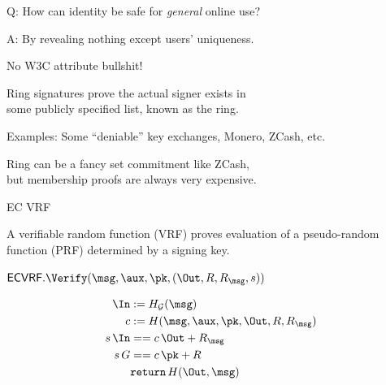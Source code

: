 \documentclass{beamer}
\begin{document}
\begin{frame} %
	
Q: How can identity be safe for {\it general} online use?

\bigskip

A: By revealing nothing except users' uniqueness.  %

\bigskip\bigskip

\hspace{10pt} No W3C attribute bullshit!

\end{frame}



\begin{frame}
	
Ring signatures prove the actual signer exists in \\
\hspace{10pt} some publicly specified list, known as the ring.

\bigskip\bigskip

Examples:  Some ``deniable'' key exchanges, Monero, ZCash, etc.

\bigskip\bigskip

Ring can be a fancy set commitment like ZCash, \\
\hspace{10pt} but membership proofs are always very expensive.
	
\end{frame}



\begin{frame}{EC VRF}

A verifiable random function (VRF) proves evaluation of a pseudo-random function (PRF) determined by a signing key.

\bigskip\bigskip

$\mathsf{ECVRF}.\Verify(\msg,\aux,\pk,(\Out,R,R_\msg,s))$
	
$$ \begin{aligned}
\In &:= H_{\mathcal{G}}(\msg) \\
c &:= H(\msg,\aux,\pk,\Out,R,R_\msg) \\
s \, \In &== c \, \Out + R_\msg \\
s \, G &== c \, \pk + R \\
& \mathtt{return}\, H(\Out,\msg) \\
\end{aligned} $$

\end{frame}
\end{document}
